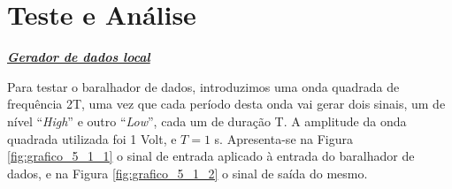 \documentclass[a4paper,11pt]{report}
\begin{document}
\section{Teste e Análise}
\par

\large\underline{{\textit{\textbf{Gerador de dados local}}}}\\
\par

Para testar o baralhador de dados, introduzimos uma onda quadrada de frequência 2T, uma vez que cada período desta onda vai gerar dois sinais, um de nível ``\textit{High}'' e outro ``\textit{Low}'', cada um de duração T. A amplitude da onda quadrada utilizada foi 1 Volt, e $T=1$ s. 
Apresenta-se na Figura \ref{fig:grafico_5_1_1} o sinal de entrada aplicado à entrada do baralhador de dados, e na Figura \ref{fig:grafico_5_1_2} o sinal de saída do mesmo.
\end{document}
